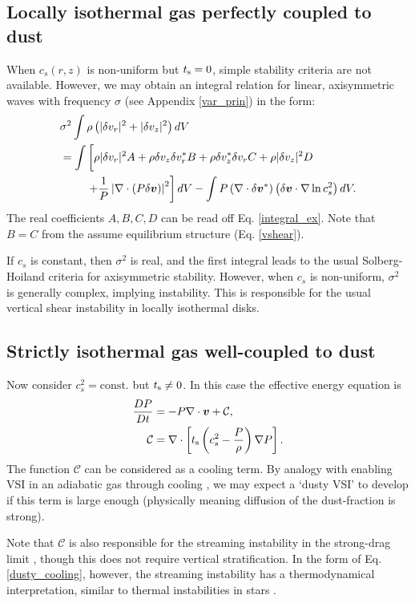 \subsection{Locally isothermal gas perfectly coupled to dust} 
When $c_s(r,z)$ is non-uniform but $t_\mathrm{s}=0$, simple stability
criteria are not available. However, we may obtain an integral
relation for linear, axisymmetric waves with frequency $\sigma$ (see
Appendix \ref{var_prin}) in the form:  
\begin{align}
&  \sigma^2\int\rho\left(|\dd v_r|^2 + |\dd v_z|^2\right)dV \notag\\
&= \int\left[ \rho
  |\dd v_r|^2A + \rho  \dd v_z \dd v_r^* B + \rho \dd v_z^*\dd v_r C +
  \rho |\dd v_z|^2 D\phantom{\frac{1}{1}}\right. \notag\\
&\phantom{===}  \left. + \frac{1}{P}\left|\nabla\cdot\left(P\dd
  \bm{v}\right)\right|^2\right]dV - \int P
  \left(\nabla\cdot\dd\bm{v}^*\right)\left(\dd\bm{v}\cdot\nabla\ln{c_s^2}\right)dV.
\end{align}
The real coefficients $A,B,C,D$ can be read off
Eq. \ref{integral_ex}. Note that $B=C$ from the assume equilibrium
structure (Eq. \ref{vshear}).  

If $c_s$ is constant, then $\sigma^2$ is real, and 
the first integral leads to the usual Solberg-Hoiland criteria for
axisymmetric stability. However, when $c_s$ is non-uniform, $\sigma^2$
is generally complex, implying instability. This is responsible for
the usual vertical shear instability in locally isothermal disks. 

\subsection{Strictly isothermal gas well-coupled to dust} 
Now consider $c_s^2=\mathrm{const.}$ but $t_\mathrm{s}\neq0$. In this case
the effective energy equation is 
\begin{align}\label{dusty_cooling}
  \frac{DP}{Dt} &= - P \nabla \cdot \bm{v} + \mathcal{C},\\
  \mathcal{C} & = \nabla\cdot\left[t_\mathrm{s}\left(c_s^2 -
    \frac{P}{\rho}\right)\nabla P\right].           
\end{align} 
The function $\mathcal{C}$ can be considered as a cooling term. By
analogy with enabling VSI in an adiabatic gas through cooling
\citep{nelson13,lin15}, we may expect a `dusty VSI' to develop 
if this term is large enough (physically meaning diffusion of the
dust-fraction is strong). 


Note that $\mathcal{C}$ is also responsible for the streaming
instability  in the strong-drag limit \citep{laibe14}, though this
does not require vertical stratification. In the form of
Eq. \ref{dusty_cooling}, however, the streaming instability has a
thermodynamical interpretation, similar to thermal instabilities in
stars \citep{latter06}.  
